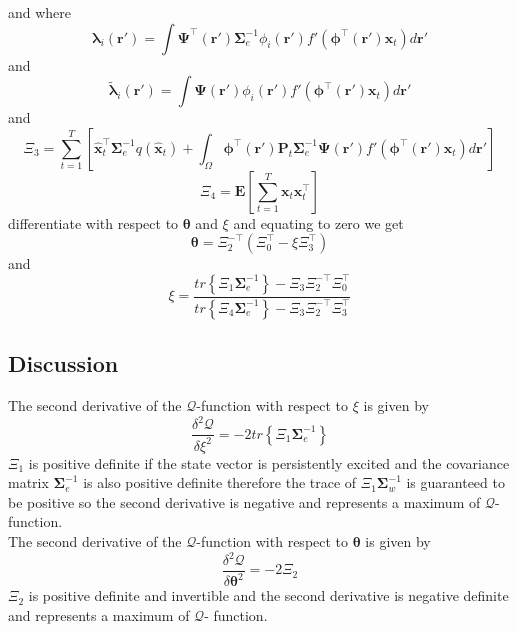 \documentclass[]{article}
\begin{document}
and where
\begin{equation}
 \boldsymbol\lambda_i(\mathbf r')=\int \boldsymbol \Psi^\top(\mathbf r')\boldsymbol \Sigma_e^{-1}\phi_i(\mathbf r')f'(\boldsymbol\phi^\top(\mathbf r')\mathbf x_t)d\mathbf r'
\end{equation}
and
\begin{equation}
 \tilde{\boldsymbol \lambda}_i(\mathbf r')=\int \boldsymbol \Psi(\mathbf r')\phi_i(\mathbf r')f'(\boldsymbol\phi^\top(\mathbf r')\mathbf x_t)d\mathbf r'
\end{equation}
and 
\begin{equation}
 \Xi_3=\sum_{t=1}^T\left[ \mathbf{\hat x}_{t}^\top\boldsymbol\Sigma_e^{-1}q(\mathbf{\hat x}_t)+\int_\Omega\boldsymbol \phi^\top(\mathbf r') \mathbf P_t \boldsymbol\Sigma_e^{-1}  \boldsymbol{\Psi}(\mathbf{r}') f'(\boldsymbol \phi^\top(\mathbf r')\mathbf {\hat x}_t) d\mathbf{r}'\right] 
\end{equation}
\begin{equation}
 \Xi_4=\mathbf E[\sum_{t=1}^T\mathbf x_t\mathbf x_{t}^\top]
\end{equation}
differentiate with respect to $\boldsymbol\theta$ and $\xi$ and equating to zero we get
\begin{equation}
 \boldsymbol \theta=\Xi_2^{-\top}\left(\Xi_0^\top-\xi\Xi_3^\top \right)
\end{equation}
and
\begin{equation}
 \xi=\frac{tr\left\lbrace \Xi_1 \boldsymbol\Sigma_e^{-1}\right\rbrace-\Xi_3\Xi_2^{-\top}\Xi_0^\top}{tr\left\lbrace \Xi_4 \boldsymbol\Sigma_e^{-1}\right\rbrace-\Xi_3\Xi_2^{-\top}\Xi_3^\top}
\end{equation}
\subsection{Discussion}
The second derivative of the $\mathcal Q$-function with respect to $\xi$ is given by
\begin{equation}
 \frac{\delta^2 \mathcal Q}{\delta \xi^2}=-2 tr \left\lbrace\Xi_1\boldsymbol\Sigma_e^{-1} \right\rbrace
\end{equation}
$\Xi_1 $ is positive definite if the state vector is persistently excited and the covariance matrix $\boldsymbol\Sigma_e^{-1}$ is also positive definite therefore the trace of $\Xi_1\boldsymbol\Sigma_w^{-1}$ is guaranteed to be positive so the second derivative is negative and represents a maximum of $\mathcal Q$-function.\\
The second derivative of the $\mathcal Q$-function with respect to $\boldsymbol \theta$ is given by
\begin{equation}
 \frac{\delta^2 \mathcal Q}{\delta \boldsymbol\theta^2}=-2 \Xi_2 
\end{equation}
$\Xi_2$ is positive definite and invertible and the second derivative is negative definite and represents a maximum of $\mathcal Q$- function.
\end{document}
